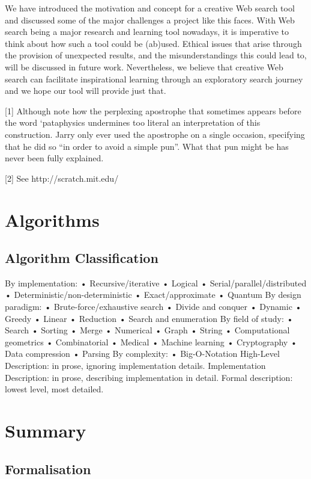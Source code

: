We have introduced the motivation and concept for a creative Web search tool and discussed some of the major challenges a project like this faces. With Web search being a major research and learning tool nowadays, it is imperative to think about how such a tool could be (ab)used. Ethical issues that arise through the provision of unexpected results, and the misunderstandings this could lead to, will be discussed in future work. Nevertheless, we believe that creative Web search can facilitate inspirational learning through an exploratory search journey and we hope our tool will provide just that.

[1] Although note how the perplexing apostrophe that sometimes appears before the word ‘pataphysics undermines too literal an interpretation of this construction. Jarry only ever used the apostrophe on a single occasion, specifying that he did so “in order to avoid a simple pun”. What that pun might be has never been fully explained.

[2] See http://scratch.mit.edu/


\section{Algorithms}

\subsection{Algorithm Classification}
By implementation:
•	Recursive/iterative
•	Logical
•	Serial/parallel/distributed
•	Deterministic/non-deterministic
•	Exact/approximate
•	Quantum
By design paradigm:
•	Brute-force/exhaustive search
•	Divide and conquer
•	Dynamic
•	Greedy
•	Linear
•	Reduction
•	Search and enumeration
By field of study:
•	Search
•	Sorting
•	Merge
•	Numerical
•	Graph
•	String
•	Computational geometrics
•	Combinatorial
•	Medical
•	Machine learning
•	Cryptography
•	Data compression
•	Parsing
By complexity:
•	Big-O-Notation
High-Level Description: in prose, ignoring implementation details.
Implementation Description: in prose, describing implementation in detail.
Formal description: lowest level, most detailed.


\section{Summary}



\subsection{Formalisation}

